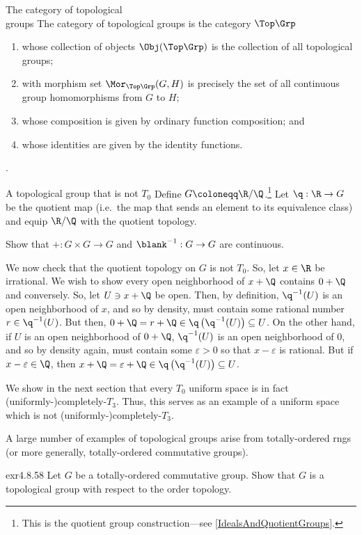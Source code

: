 \begin{exm}{The category of topological \\ groups}{}
The category of topological groups is the category $\Top \Grp$\index[notation]{$\Top \Grp$}
\begin{enumerate}
\item whose collection of objects $\Obj (\Top \Grp )$ is the collection of all topological groups;
\item with morphism set $\Mor _{\Top \Grp}(G,H)$ is precisely the set of all continuous group homomorphisms from $G$ to $H$;
\item whose composition is given by ordinary function composition; and
\item whose identities are given by the identity functions.
\end{enumerate}.
\end{exm}
\begin{exm}{A topological group that is not $T_0$}{}
Define $G\coloneqq \R /\Q$.\footnote{This is the quotient group construction---see \cref{IdealsAndQuotientGroups}.}  Let $\q :\R \rightarrow G$ be the quotient map (i.e.~the map that sends an element to its equivalence class) and equip $\R /\Q$ with the quotient topology.
\begin{exr}[breakable=false]{}{}
Show that $+:G\times G\rightarrow G$ and $\blank ^{-1}:G\rightarrow G$ are continuous.
\end{exr}
We now check that the quotient topology on $G$ is not $T_0$.  So, let $x\in \R$ be irrational.  We wish to show every open neighborhood of $x+\Q$ contains $0+\Q$ and conversely.  So, let $U\ni x+\Q$ be open.  Then, by definition, $\q ^{-1}(U)$ is an open neighborhood of $x$, and so by density, must contain some rational number $r\in \q ^{-1}(U)$.  But then, $0+\Q =r+\Q \in \q \left( \q ^{-1}(U)\right) \subseteq U$.  On the other hand, if $U$ is an open neighborhood of $0+\Q$, $\q ^{-1}(U)$ is an open neighborhood of $0$, and so by density again, must contain some $\varepsilon >0$ so that $x-\varepsilon$ is rational.  But if $x-\varepsilon \in \Q$, then $x+\Q =\varepsilon +\Q \in \q \left( \q ^{-1}(U)\right) \subseteq U$.
\begin{rmk}
We show in the next section that every $T_0$ uniform space is in fact (uniformly-)completely-$T_3$.  Thus, this serves as an example of a uniform space which is not (uniformly-)completely-$T_3$.
\end{rmk}
\end{exm}
A large number of examples of topological groups arise from totally-ordered rngs (or more generally, totally-ordered commutative groups).
\begin{exr}{}{exr4.8.58}
Let $G$ be a totally-ordered commutative group.  Show that $G$ is a topological group with respect to the order topology.
\end{exr}

